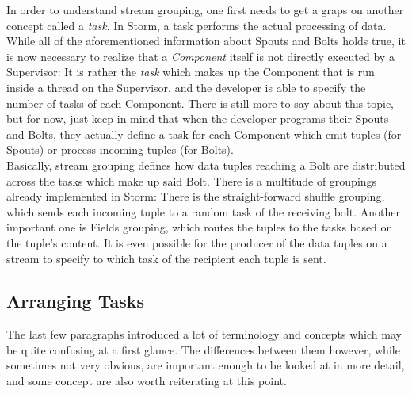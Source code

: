 \documentclass[12pt,a4paper]{article}
\begin{document}
In order to understand stream grouping, one first needs to get a graps on another concept called a \textit{task}. In Storm, a task performs the actual processing of data. While all of the aforementioned information about Spouts and Bolts holds true, it is now necessary to realize that a \textit{Component} itself is not directly executed by a Supervisor: It is rather the \textit{task} which makes up the Component that is run inside a thread on the Supervisor, and the developer is able to specify the number of tasks of each Component. There is still more to say about this topic, but for now, just keep in mind that when the developer programs their Spouts and Bolts, they actually define a task for each Component which emit tuples (for Spouts) or process incoming tuples (for Bolts).\\
\indent Basically, stream grouping defines how data tuples reaching a Bolt are distributed across the tasks which make up said Bolt. There is a multitude of groupings already implemented in Storm: There is the straight-forward shuffle grouping, which sends each incoming tuple to a random task of the receiving bolt. Another important one is Fields grouping, which routes the tuples to the tasks based on the tuple's content. It is even possible for the producer of the data tuples on a stream to specify to which task of the recipient each tuple is sent.

\subsection{Arranging Tasks}

The last few paragraphs introduced a lot of terminology and concepts which may be quite confusing at a first glance. The differences between them however, while sometimes not very obvious, are important enough to be looked at in more detail, and some concept are also worth reiterating at this point.\\
\end{document}
